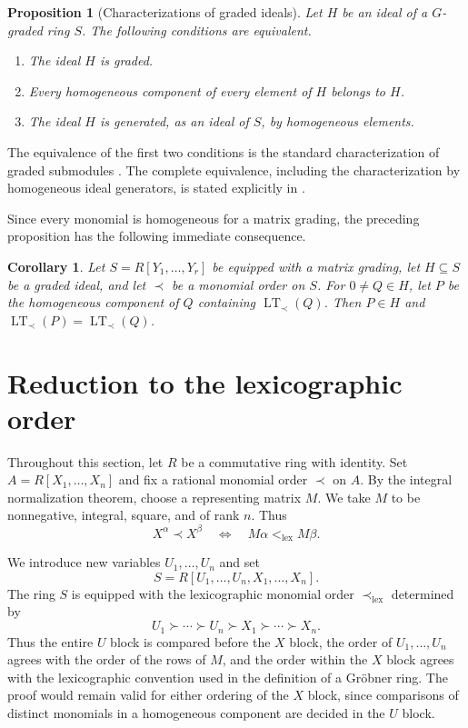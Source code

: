 \documentclass[preprint,12pt,3p]{elsarticle}
\newtheorem{proposition}[theorem]{Proposition}
\newtheorem{corollary}[theorem]{Corollary}
\theoremstyle{definition}
\theoremstyle{remark}
\newcommand{\LT}{\operatorname{LT}}
\begin{document}
	\begin{proposition}[Characterizations of graded ideals]
		\label{prop:graded-ideal-characterization}
		Let $H$ be an ideal of a $G$-graded ring $S$. The following
		conditions are equivalent.
		\begin{enumerate}
			\item The ideal $H$ is graded.
			\item Every homogeneous component of every element of $H$
			belongs to $H$.
			\item The ideal $H$ is generated, as an ideal of $S$, by
			homogeneous elements.
		\end{enumerate}
	\end{proposition}
	
	The equivalence of the first two conditions is the standard
	characterization of graded submodules
	\cite[Chapter~A, Section~I.1, p.~3]
	{NastasescuVanOystaeyen1982}. The complete equivalence, including the
	characterization by homogeneous ideal generators, is stated explicitly
	in \cite[Section~1.1.5, p.~20]{Hazrat2016}.
	
	Since every monomial is homogeneous for a matrix grading, the preceding
	proposition has the following immediate consequence.
	
	\begin{corollary}
		\label{cor:component-containing-leading-term}
		Let $S=R[Y_1,\ldots,Y_r]$ be equipped with a matrix grading, let
		$H\subseteq S$ be a graded ideal, and let $\prec$ be a monomial
		order on $S$. For $0\neq Q\in H$, let $P$ be the homogeneous
		component of $Q$ containing $\LT_\prec(Q)$. Then $P\in H$ and
		$\LT_\prec(P)=\LT_\prec(Q)$.
	\end{corollary}
	
	\section{Reduction to the lexicographic order}\label{sec:reduction}
	
	Throughout this section, let $R$ be a commutative ring with identity.
	Set $A=R[X_1,\ldots,X_n]$ and fix a rational monomial order
	$\prec$ on $A$. By the integral normalization theorem, choose a
	representing matrix $M$. We take $M$ to be nonnegative, integral,
	square, and of rank $n$. Thus
	\[
	X^\alpha\prec X^\beta
	\quad\Longleftrightarrow\quad
	M\alpha<_{\mathrm{lex}}M\beta.
	\]
	
	We introduce new variables $U_1,\ldots,U_n$ and set
	\[
	S=R[U_1,\ldots,U_n,X_1,\ldots,X_n].
	\]
	The ring $S$ is equipped with the lexicographic monomial order
	$\prec_{\mathrm{lex}}$ determined by
	\[
	U_1\succ\cdots\succ U_n\succ X_1\succ\cdots\succ X_n.
	\]
	Thus the entire $U$ block is compared before the $X$ block, the order
	of $U_1,\ldots,U_n$ agrees with the order of the rows of $M$, and the
	order within the $X$ block agrees with the lexicographic convention
	used in the definition of a Gr\"obner ring. The proof would remain
	valid for either ordering of the $X$ block, since comparisons of
	distinct monomials in a homogeneous component are decided in the
	$U$ block.
	
\end{document}
